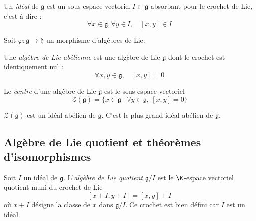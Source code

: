 \begin{definition}
    Un \emph{idéal} de $\mathfrak{g}$ est un sous-espace vectoriel $I \subset \mathfrak{g}$ absorbant pour le crochet de Lie, c'est à dire :
    $$\forall x \in \mathfrak{g}, \forall y \in I, \quad [x, y] \in I$$ 
\end{definition}

\begin{proposition}
    Soit $\varphi: \mathfrak{g} \to \mathfrak{h}$ un morphisme d'algèbres de Lie.
\end{proposition}

\omitted

\begin{definition}
    Une \emph{algèbre de Lie abélienne} est une algèbre de Lie $\mathfrak{g}$ dont le crochet est identiquement nul :
    $$\forall x, y \in \mathfrak{g}, \quad [x, y] = 0$$
\end{definition}

\begin{definition}
    Le \emph{centre} d'une algèbre de Lie $\mathfrak{g}$ est le sous-espace vectoriel
    $$\mathcal{Z}(\mathfrak{g}) = \{ x \in \mathfrak{g} \mid \forall y \in \mathfrak{g},\ [x, y] = 0 \}$$
\end{definition}

\begin{proposition}
    $\mathcal{Z}(\mathfrak{g})$ est un idéal abélien de $\mathfrak{g}$. C'est le plus grand idéal abélien de $\mathfrak{g}$.
\end{proposition}

\omitted

\subsection{Algèbre de Lie quotient et théorèmes d'isomorphismes}

\begin{definition}
    Soit $I$ un idéal de $\mathfrak{g}$. L'\emph{algèbre de Lie quotient} $\mathfrak{g}/I$ est le $\K$-espace vectoriel quotient muni du crochet de Lie
    $$[x+I, y+I] = [x,y]+I$$
    où $x + I$ désigne la classe de $x$ dans $\mathfrak{g}/I$. Ce crochet est bien défini car $I$ est un idéal.
\end{definition}

